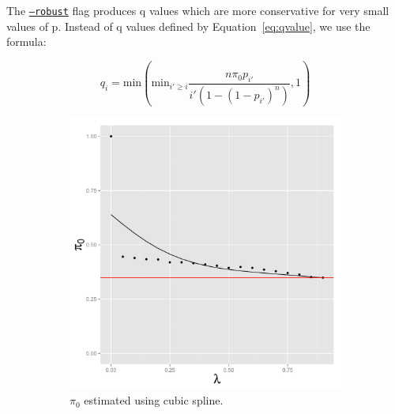 \documentclass{amsart}
\begin{document}
The \underline{\texttt{--robust}} flag produces q values which are more conservative for very small values of p. Instead of q values defined by Equation~\ref{eq:qvalue}, we use the formula:

\begin{equation}
\label{eq:robust}
q_i = \text{min}(\text{min}_{i' \geq i} \frac{n \pi_0p_{i'}} {i'(1 - (1 - p_{i'})^n) }, 1)
\end{equation}

\begin{figure}
  \centering
  \begin{subfigure}[b]{0.5\textwidth}
    \includegraphics[width=\textwidth]{simple_diagnostic}
   \caption{$\pi_0$ estimated using cubic spline.}
   \label{fig:spline_param}
  \end{subfigure}~
  \begin{subfigure}[b]{0.5\textwidth}

\end{subfigure}
\end{figure}
\end{document}
